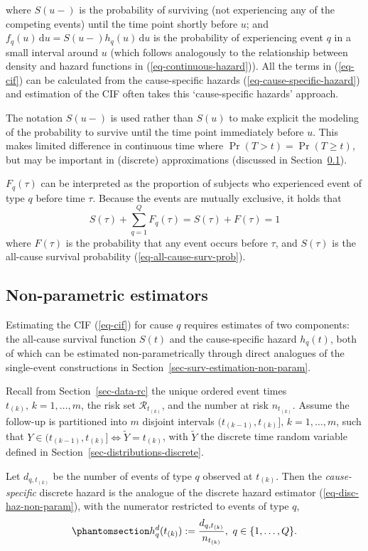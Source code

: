\documentclass[
  letterpaper,
  krantz2]{style/krantz}
\begin{document}
where \(S(u-)\) is the probability of surviving (not experiencing any of
the competing events) until the time point shortly before \(u\); and
\(f_q(u)\,\mathrm{d}u= S(u-)h_q(u)\,\mathrm{d}u\) is the probability of
experiencing event \(q\) in a small interval around \(u\) (which follows
analogously to the relationship between density and hazard functions in
(\ref{eq-continuous-hazard})). All the terms in (\ref{eq-cif}) can be
calculated from the cause-specific hazards
(\ref{eq-cause-specific-hazard}) and estimation of the CIF often takes
this `cause-specific hazards' approach.

The notation \(S(u-)\) is used rather than \(S(u)\) to make explicit the
modeling of the probability to survive until the time point immediately
before \(u\). This makes limited difference in continuous time where
\(\Pr(T > t) = \Pr(T\geq t)\), but may be important in (discrete)
approximations (discussed in Section~\ref{sec-aalen-johansen}).

\(F_q(\tau)\) can be interpreted as the proportion of subjects who
experienced event of type \(q\) before time \(\tau\). Because the events
are mutually exclusive, it holds that \[
S(\tau) + \sum_{q=1}^Q F_q(\tau) =  S(\tau) + F(\tau)= 1
\] where \(F(\tau)\) is the probability that any event occurs before
\(\tau\), and \(S(\tau)\) is the all-cause survival probability
(\ref{eq-all-cause-surv-prob}).

\subsection{Non-parametric estimators}\label{sec-aalen-johansen}

Estimating the CIF (\ref{eq-cif}) for cause \(q\) requires estimates of
two components: the all-cause survival function \(S(t)\) and the
cause-specific hazard \(h_q(t)\), both of which can be estimated
non-parametrically through direct analogues of the single-event
constructions in Section~\ref{sec-surv-estimation-non-param}.

Recall from Section~\ref{sec-data-rc} the unique ordered event times
\(t_{(k)},\, k=1,\ldots,m\), the risk set \(\mathcal{R}_{t_{(k)}}\), and
the number at risk \(n_{t_{(k)}}\). Assume the follow-up is partitioned
into \(m\) disjoint intervals \((t_{(k-1)}, t_{(k)}],\, k=1,\ldots,m\),
such that
\(Y \in (t_{(k-1)}, t_{(k)}] \Leftrightarrow \tilde{Y}=t_{(k)}\), with
\(\tilde{Y}\) the discrete time random variable defined in
Section~\ref{sec-distributions-discrete}.

Let \(d_{q,t_{(k)}}\) be the number of events of type \(q\) observed at
\(t_{(k)}\). Then the \emph{cause-specific} discrete hazard is the
analogue of the discrete hazard estimator (\ref{eq-disc-haz-non-param}),
with the numerator restricted to events of type \(q\),
\begin{equation}\phantomsection\label{eq-cs-discrete-hazard}{
h^d_{q}(t_{(k)}) := \frac{d_{q,t_{(k)}}}{n_{t_{(k)}}},\ q \in \{1, \ldots, Q\}.
}\end{equation}
\end{document}
